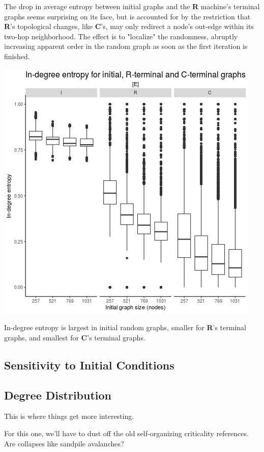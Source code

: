 \documentclass{tufte-handout}
\begin{document}
The drop in average entropy between initial graphs and the \textbf{R} machine's terminal
graphs seems surprising on its face, but is accounted for by the restriction that
\textbf{R}'s topological changes, like \textbf{C}'s, may only redirect a node's out-edge
within its two-hop neighborhood.
The effect is to "localize" the randomness, abruptly increasing apparent order in the
random graph as soon as the first iteration is finished.

\begin{marginfigure}
  \includegraphics{figE.png}
  \caption{In-degree entropy is largest in initial random graphs,
        smaller for \textbf{R}'s terminal graphs, and smallest for \textbf{C}'s terminal graphs.}
  \label{fig:figE}
\end{marginfigure}

\subsection{Sensitivity to Initial Conditions}

\subsection{Degree Distribution}

This is where things get more interesting.

For this one, we'll have to dust off the old self-organizing criticality
references. Are collapses like sandpile avalanches?
\end{document}
